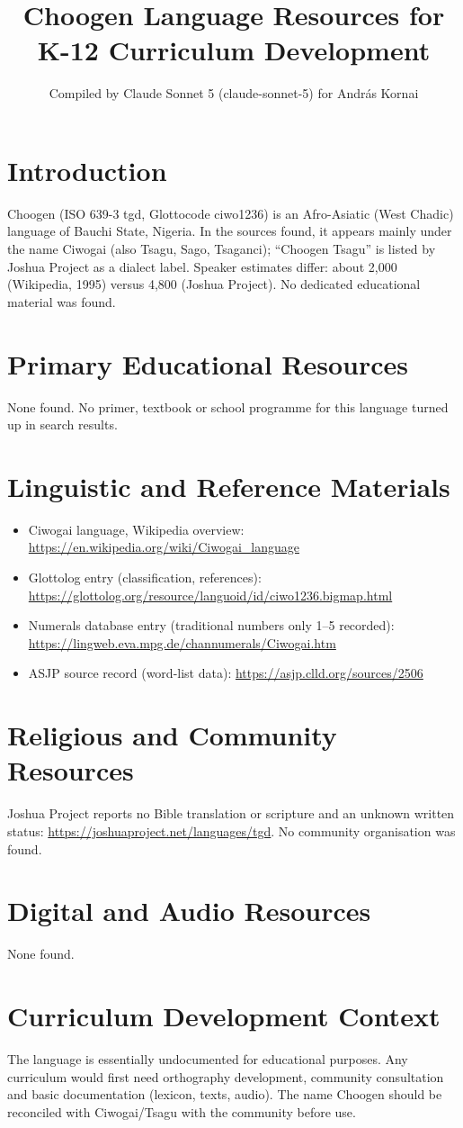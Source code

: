 \documentclass[12pt]{article}
\title{Choogen Language Resources for K-12 Curriculum Development}
\author{Compiled by Claude Sonnet 5 (claude-sonnet-5) for Andr\'as Kornai}
\date{}
\begin{document}
\maketitle

\section{Introduction}
Choogen (ISO 639-3 tgd, Glottocode ciwo1236) is an Afro-Asiatic (West Chadic) language of Bauchi State, Nigeria. In the sources found, it appears mainly under the name Ciwogai (also Tsagu, Sago, Tsaganci); ``Choogen Tsagu'' is listed by Joshua Project as a dialect label. Speaker estimates differ: about 2,000 (Wikipedia, 1995) versus 4,800 (Joshua Project). No dedicated educational material was found.

\section{Primary Educational Resources}
None found. No primer, textbook or school programme for this language turned up in search results.

\section{Linguistic and Reference Materials}
\begin{itemize}
\item Ciwogai language, Wikipedia overview: \url{https://en.wikipedia.org/wiki/Ciwogai_language}
\item Glottolog entry (classification, references): \url{https://glottolog.org/resource/languoid/id/ciwo1236.bigmap.html}
\item Numerals database entry (traditional numbers only 1--5 recorded): \url{https://lingweb.eva.mpg.de/channumerals/Ciwogai.htm}
\item ASJP source record (word-list data): \url{https://asjp.clld.org/sources/2506}
\end{itemize}

\section{Religious and Community Resources}
Joshua Project reports no Bible translation or scripture and an unknown written status: \url{https://joshuaproject.net/languages/tgd}. No community organisation was found.

\section{Digital and Audio Resources}
None found.

\section{Curriculum Development Context}
The language is essentially undocumented for educational purposes. Any curriculum would first need orthography development, community consultation and basic documentation (lexicon, texts, audio). The name Choogen should be reconciled with Ciwogai/Tsagu with the community before use.
\end{document}

